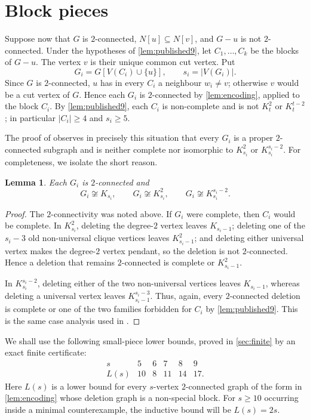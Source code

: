 \documentclass[11pt,reqno]{amsart}
\newtheorem{lemma}[lemma]{Lemma}
\theoremstyle{definition}
\theoremstyle{remark}
\begin{document}
\section{Block pieces}\label{sec:blocks}

Suppose now that $G$ is $2$-connected, $N[u]\subseteq N[v]$, and $G-u$ is
not $2$-connected.  Under the hypotheses of \cref{lem:published9}, let
$C_1,\dots,C_k$ be the blocks of $G-u$.  The vertex $v$ is their unique
common cut vertex.  Put
\[
  G_i=G[V(C_i)\cup\{u\}],\qquad s_i=|V(G_i)|.
\]
Since $G$ is $2$-connected, $u$ has in every $C_i$ a neighbour
$w_i\ne v$; otherwise $v$ would be a cut vertex of $G$.  Hence each $G_i$ is
$2$-connected by \cref{lem:encoding}, applied to the block $C_i$.  By
\cref{lem:published9}, each $C_i$ is non-complete and is not $K_t^2$ or
$K_t^{t-2}$; in particular $|C_i|\ge4$ and $s_i\ge5$.

The proof of \cite[Theorem~4]{BKLPS} observes in precisely this
situation that every $G_i$ is a proper $2$-connected subgraph and is neither
complete nor isomorphic to $K_{s_i}^2$ or $K_{s_i}^{s_i-2}$.  For completeness,
we isolate the short reason.

\begin{lemma}\label{lem:pieces-nonspecial}
Each $G_i$ is $2$-connected and
\[
 G_i\not\cong K_{s_i},\qquad
 G_i\not\cong K_{s_i}^2,\qquad
 G_i\not\cong K_{s_i}^{s_i-2}.
\]
\end{lemma}

\begin{proof}
The $2$-connectivity was noted above.  If $G_i$ were complete, then $C_i$
would be complete.  In $K_{s_i}^2$, deleting the degree-$2$ vertex leaves
$K_{s_i-1}$; deleting one of the $s_i-3$ old non-universal clique vertices
leaves $K_{s_i-1}^2$; and deleting either universal vertex makes the degree-$2$
vertex pendant, so the deletion is not $2$-connected.  Hence a deletion that
remains $2$-connected is complete or $K_{s_i-1}^2$.

In $K_{s_i}^{s_i-2}$, deleting either of the two non-universal vertices leaves
$K_{s_i-1}$, whereas deleting a universal vertex leaves
$K_{s_i-1}^{s_i-3}$.  Thus, again, every $2$-connected deletion is complete or
one of the two families forbidden for $C_i$ by \cref{lem:published9}.  This
is the same case analysis used in \cite[proof of Theorem~4]{BKLPS}.
\end{proof}

We shall use the following small-piece lower bounds, proved in
\cref{sec:finite} by an exact finite certificate:
\begin{equation}\label{eq:Ltable}
\begin{array}{c|ccccc}
 s&5&6&7&8&9\\ \hline
 L(s)&10&8&11&14&17.
\end{array}
\end{equation}
Here $L(s)$ is a lower bound for every $s$-vertex $2$-connected graph of the
form in \cref{lem:encoding} whose deletion graph is a non-special block.
For $s\ge10$ occurring inside a minimal counterexample, the inductive bound
will be $L(s)=2s$.
\end{document}
